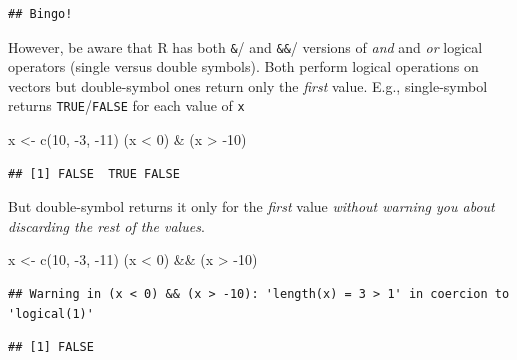 \documentclass[
]{book}
\newenvironment{Shaded}{\begin{snugshade}}{\end{snugshade}}
\newcommand{\DecValTok}[1]{\textcolor[rgb]{0.00,0.00,0.81}{#1}}
\newcommand{\FunctionTok}[1]{\textcolor[rgb]{0.00,0.00,0.00}{#1}}
\newcommand{\NormalTok}[1]{#1}
\newcommand{\OtherTok}[1]{\textcolor[rgb]{0.56,0.35,0.01}{#1}}
\newcommand{\SpecialCharTok}[1]{\textcolor[rgb]{0.00,0.00,0.00}{#1}}
\begin{document}
\begin{verbatim}
## Bingo!
\end{verbatim}

However, be aware that R has both \texttt{\&}/\texttt{\textbar{}} and \texttt{\&\&}/\texttt{\textbar{}\textbar{}} versions of \emph{and} and \emph{or} logical operators (single versus double symbols). Both perform logical operations on vectors but double-symbol ones return only the \emph{first} value. E.g., single-symbol returns \texttt{TRUE}/\texttt{FALSE} for each value of \texttt{x}

\begin{Shaded}
\begin{Highlighting}[]
\NormalTok{x }\OtherTok{\textless{}{-}} \FunctionTok{c}\NormalTok{(}\DecValTok{10}\NormalTok{, }\SpecialCharTok{{-}}\DecValTok{3}\NormalTok{, }\SpecialCharTok{{-}}\DecValTok{11}\NormalTok{)}
\NormalTok{(x }\SpecialCharTok{\textless{}} \DecValTok{0}\NormalTok{) }\SpecialCharTok{\&}\NormalTok{ (x }\SpecialCharTok{\textgreater{}} \SpecialCharTok{{-}}\DecValTok{10}\NormalTok{)}
\end{Highlighting}
\end{Shaded}

\begin{verbatim}
## [1] FALSE  TRUE FALSE
\end{verbatim}

But double-symbol returns it only for the \emph{first} value \emph{without warning you about discarding the rest of the values}.

\begin{Shaded}
\begin{Highlighting}[]
\NormalTok{x }\OtherTok{\textless{}{-}} \FunctionTok{c}\NormalTok{(}\DecValTok{10}\NormalTok{, }\SpecialCharTok{{-}}\DecValTok{3}\NormalTok{, }\SpecialCharTok{{-}}\DecValTok{11}\NormalTok{)}
\NormalTok{(x }\SpecialCharTok{\textless{}} \DecValTok{0}\NormalTok{) }\SpecialCharTok{\&\&}\NormalTok{ (x }\SpecialCharTok{\textgreater{}} \SpecialCharTok{{-}}\DecValTok{10}\NormalTok{)}
\end{Highlighting}
\end{Shaded}

\begin{verbatim}
## Warning in (x < 0) && (x > -10): 'length(x) = 3 > 1' in coercion to 'logical(1)'
\end{verbatim}

\begin{verbatim}
## [1] FALSE
\end{verbatim}
\end{document}
